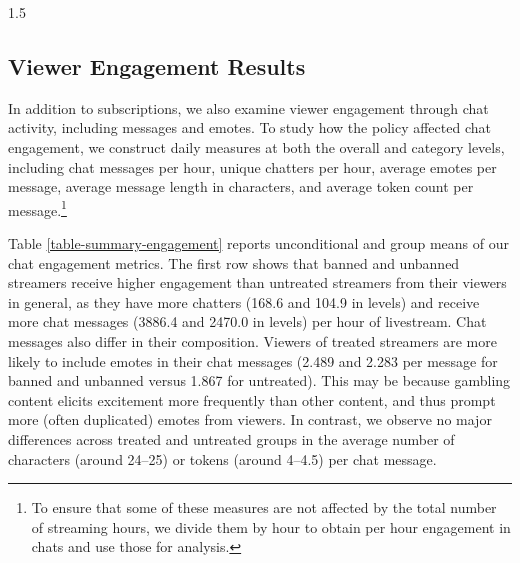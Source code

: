 \documentclass[a4paper,12pt]{article}
\begin{document}
\begin{spacing}{1.5}
\subsection{Viewer Engagement Results}\label{subsection-total-chat-engagement}
In addition to subscriptions, we also examine viewer engagement through chat activity, including messages and emotes. To study how the policy affected chat engagement, we construct daily measures at both the overall and category levels, including chat messages per hour, unique chatters per hour, average emotes per message, average message length in characters, and average token count per message.\footnote{To ensure that some of these measures are not affected by the total number of streaming hours, we divide them by hour to obtain per hour engagement in chats and use those for analysis.}  

Table \ref{table-summary-engagement} reports unconditional and group means of our chat engagement metrics. The first row shows that banned and unbanned streamers receive higher engagement than untreated streamers from their viewers in general, as they have more chatters (168.6 and 104.9 in levels) and receive more chat messages (3886.4 and 2470.0 in levels) per hour of livestream. Chat messages also differ in their composition. Viewers of treated streamers are more likely to include emotes in their chat messages (2.489 and 2.283 per message for banned and unbanned versus 1.867 for untreated). This may be because gambling content elicits excitement more frequently than other content, and thus prompt more (often duplicated) emotes from viewers. In contrast, we observe no major differences across treated and untreated groups in the average number of characters (around 24–25) or tokens (around 4–4.5) per chat message.


\end{spacing}
\end{document}
